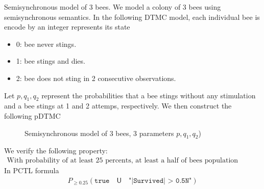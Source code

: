 \begin{example}{Semisynchronous model of 3 bees.}
    We model a colony of 3 bees using semisynchronous semantics. In the following DTMC model, each
    individual bee is encode by an integer represents its state
    \begin{itemize}
        \item 0: bee never stings.
        \item 1: bee stings and dies.
        \item 2: bee does not sting in 2 consecutive observations.
    \end{itemize}
    Let $p, q_1, q_2$ represent the probabilities that a bee stings without any stimulation and a
    bee stings at 1 and 2 attemps, respectively. We then construct the following pDTMC
    \begin{figure}[H]
        \centering
        \caption{Semisynchronous model of 3 bees, 3 parameters $p, q_1, q_2$)}
    \end{figure}
\end{example}
We verify the following property:
\begin{align*}
    \text{With probability of at least 25 percents, at least a half of bees population survives.}
\end{align*}
In PCTL formula
\begin{align*}
    P_{\geq 0.25} ( \texttt{true} \quad \mathsf{U} \quad \texttt{"|Survived| > 0.5N"} )
\end{align*}


